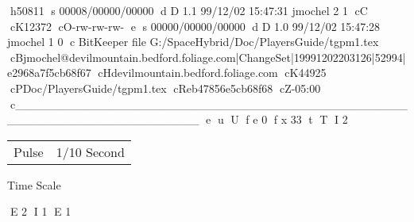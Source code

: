 h50811
s 00008/00000/00000
d D 1.1 99/12/02 15:47:31 jmochel 2 1
cC
cK12372
cO-rw-rw-rw-
e
s 00000/00000/00000
d D 1.0 99/12/02 15:47:28 jmochel 1 0
c BitKeeper file G:/SpaceHybrid/Doc/PlayersGuide/tgpm1.tex
cBjmochel@devilmountain.bedford.foliage.com|ChangeSet|19991202203126|52994|e2968a7f5cb68f67
cHdevilmountain.bedford.foliage.com
cK44925
cPDoc/PlayersGuide/tgpm1.tex
cReb47856e5cb68f68
cZ-05:00
c______________________________________________________________________
e
u
U
f e 0
f x 33
t
T
I 2
\begin{SHTable}
\begin{tabular}{ll} 
	Pulse      & 1/10 Second	\\
	\end{tabular}
	\caption{Time Scale}	
\end{SHTable}
E 2
I 1
E 1
